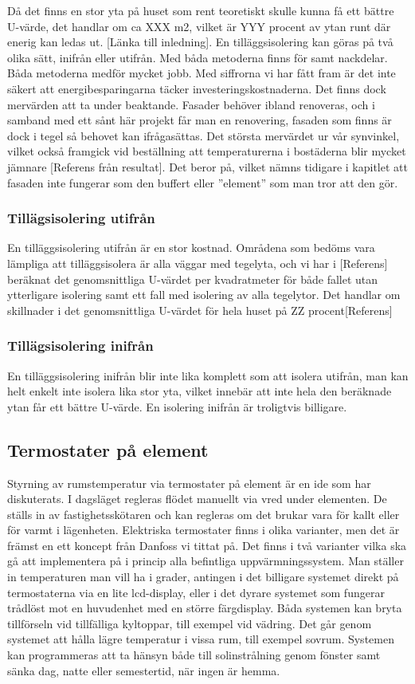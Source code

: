 Då det finns en stor yta på huset som rent teoretiskt skulle kunna få ett bättre U-värde, det handlar om ca XXX m2, vilket är YYY procent av ytan runt där enerig kan ledas ut. [Länka till inledning].
En tilläggsisolering kan göras på två olika sätt, inifrån eller utifrån. Med båda metoderna finns för samt nackdelar. Båda metoderna medför mycket jobb. Med siffrorna vi har fått fram är det inte säkert att energibesparingarna täcker investeringskostnaderna. Det finns dock mervärden att ta under beaktande. Fasader behöver ibland renoveras, och i samband med ett sånt här projekt får man en renovering, fasaden som finns är dock i tegel så behovet kan ifrågasättas. Det största mervärdet ur vår synvinkel, vilket också framgick vid beställning att temperaturerna i bostäderna blir mycket jämnare [Referens från resultat]. Det beror på, vilket nämns tidigare i kapitlet att fasaden inte fungerar som den buffert eller ”element” som man tror att den gör.
\subsubsection{Tillägsisolering utifrån}
En tilläggsisolering utifrån är en stor kostnad. Områdena som bedöms vara lämpliga att tilläggsisolera är alla väggar med tegelyta, och vi har i [Referens] beräknat det genomsnittliga U-värdet per kvadratmeter för både fallet utan ytterligare isolering samt ett fall med isolering av alla tegelytor. Det handlar om skillnader i det genomsnittliga U-värdet för hela huset på ZZ procent[Referens]
\subsubsection{Tillägsisolering inifrån}
En tilläggsisolering inifrån blir inte lika komplett som att isolera utifrån, man kan helt enkelt inte isolera lika stor yta, vilket innebär att inte hela den beräknade ytan får ett bättre U-värde. En isolering inifrån är troligtvis billigare.
\subsection{Termostater på element}
Styrning av rumstemperatur via termostater på element är en ide som har diskuterats. I dagsläget regleras flödet manuellt via vred under elementen. De ställs in av fastighetsskötaren och kan regleras om det brukar vara för kallt eller för varmt i lägenheten. 
Elektriska termostater finns i olika varianter, men det är främst en ett koncept från Danfoss vi tittat på. Det finns i två varianter vilka ska gå att implementera på i princip alla befintliga uppvärmningssystem. Man ställer in temperaturen man vill ha i grader, antingen i det billigare systemet direkt på termostaterna via en lite lcd-display, eller i det dyrare systemet som fungerar trådlöst mot en huvudenhet med en större färgdisplay. 
Båda systemen kan bryta tillförseln vid tillfälliga kyltoppar, till exempel vid vädring. Det går genom systemet att hålla lägre temperatur i vissa rum, till exempel sovrum. Systemen kan programmeras att ta hänsyn både till solinstrålning genom fönster samt sänka dag, natte eller semestertid, när ingen är hemma.
